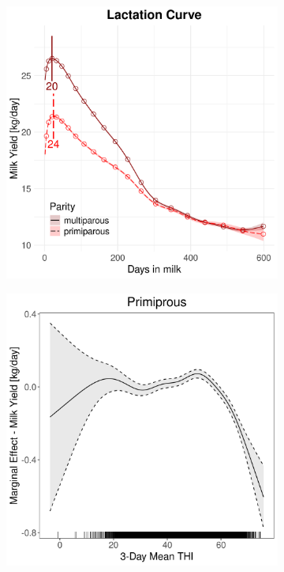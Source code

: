 \begin{figure}[H]
\begin{subfigure}[b]{0.45\textwidth}
        \includegraphics[width=\textwidth]{thesis/figures/models/milk/full/ob_milk_full/ob_milk_full_marginal_dim_milk_combined.png}
    \end{subfigure}
    \begin{subfigure}[b]{0.45\textwidth}
        \centering
        \includegraphics[width=\textwidth]{thesis/figures/models/milk/full/ob_milk_full/ob_milk_full_marginal_thi_milk_primi.png}

\end{subfigure}
\end{figure}

